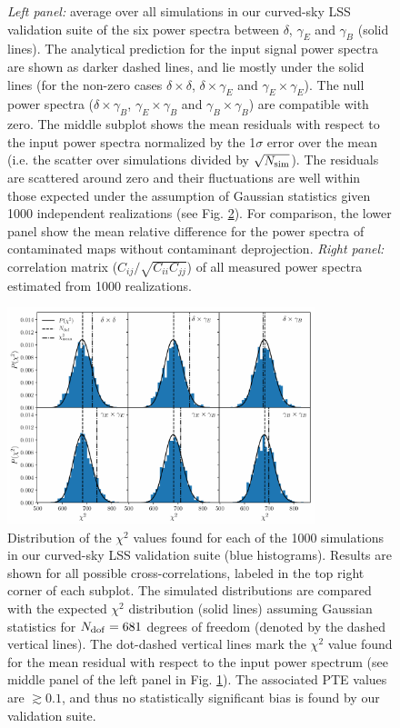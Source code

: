 \documentclass[usenatbib]{mnrasb}
\begin{document}
\begin{figure}
        \caption{{\sl Left panel:} average over all simulations in our curved-sky LSS validation suite of the six power spectra between $\delta$, $\gamma_E$ and $\gamma_B$ (solid lines). The analytical prediction for the input signal power spectra are shown as darker dashed lines, and lie mostly under the solid lines (for the non-zero cases $\delta\times\delta$, $\delta\times\gamma_E$ and $\gamma_E\times\gamma_E$). The null power spectra ($\delta\times\gamma_B$, $\gamma_E\times\gamma_B$ and $\gamma_B\times\gamma_B$) are compatible with zero. The middle subplot shows the mean residuals with respect to the input power spectra normalized by the 1$\sigma$ error over the mean (i.e. the scatter over simulations divided by $\sqrt{N_{\rm sim}}$). The residuals are scattered around zero and their fluctuations are well within those expected under the assumption of Gaussian statistics given 1000 independent realizations (see Fig. \ref{fig:lss_val_chi2}). For comparison, the lower panel show the mean relative difference for the power spectra of contaminated maps without contaminant deprojection. {\sl Right panel:} correlation matrix ($C_{ij}/\sqrt{C_{ii}C_{jj}}$) of all measured power spectra estimated from 1000 realizations.} \label{fig:lss_val_cls}
      \end{figure}
      \begin{figure}
        \centering
        \includegraphics[width=0.80\textwidth]{val_chi2_lss_sph}
        \caption{Distribution of the $\chi^2$ values found for each of the 1000 simulations in our curved-sky LSS validation suite (blue histograms). Results are shown for all possible cross-correlations, labeled in the top right corner of each subplot. The simulated distributions are compared with the expected $\chi^2$ distribution (solid lines) assuming Gaussian statistics for $N_{\rm dof}=681$ degrees of freedom (denoted by the dashed vertical lines). The dot-dashed vertical lines mark the $\chi^2$ value found for the mean residual with respect to the input power spectrum (see middle panel of the left panel in Fig. \ref{fig:lss_val_cls}). The associated PTE values are $\gtrsim0.1$, and thus no statistically significant bias is found by our validation suite.} \label{fig:lss_val_chi2}
      \end{figure}
\end{document}
